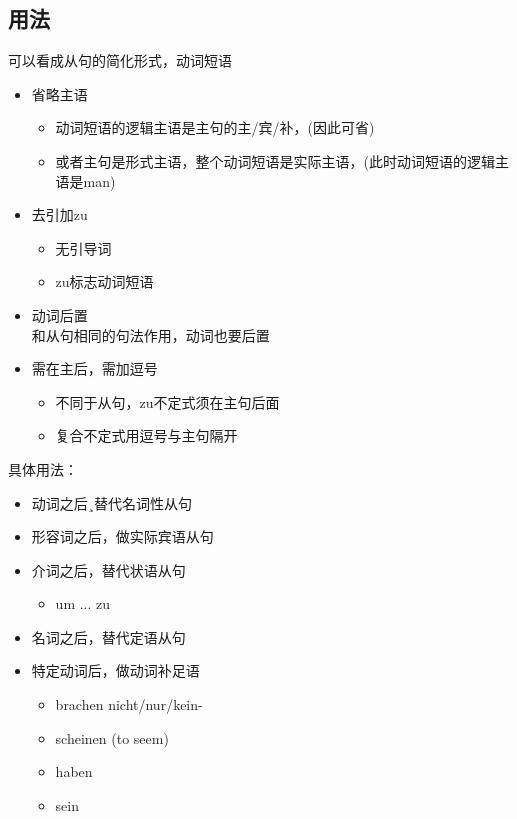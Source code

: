 \subsection{用法}
可以看成从句的简化形式，动词短语
\begin{itemize}
    \item 省略主语
          \begin{itemize}
              \item 动词短语的逻辑主语是主句的主/宾/补，(因此可省)
              \item 或者主句是形式主语，整个动词短语是实际主语，(此时动词短语的逻辑主语是man)
          \end{itemize}
    \item 去引加zu
          \begin{itemize}
              \item 无引导词
              \item zu标志动词短语
          \end{itemize}
    \item 动词后置 \\
          和从句相同的句法作用，动词也要后置
    \item 需在主后，需加逗号 \\
          \begin{itemize}
              \item 不同于从句，zu不定式须在主句后面
              \item 复合不定式用逗号与主句隔开
          \end{itemize}
\end{itemize}

具体用法：
\begin{itemize}
    \item 动词之后¸替代名词性从句
    \item 形容词之后，做实际宾语从句
    \item 介词之后，替代状语从句
          \begin{itemize}
              \item um ... zu
          \end{itemize}
    \item 名词之后，替代定语从句
    \item 特定动词后，做动词补足语
          \begin{itemize}
              \item brachen nicht/nur/kein-
              \item scheinen (to seem)
              \item haben
              \item sein
          \end{itemize}
\end{itemize}

